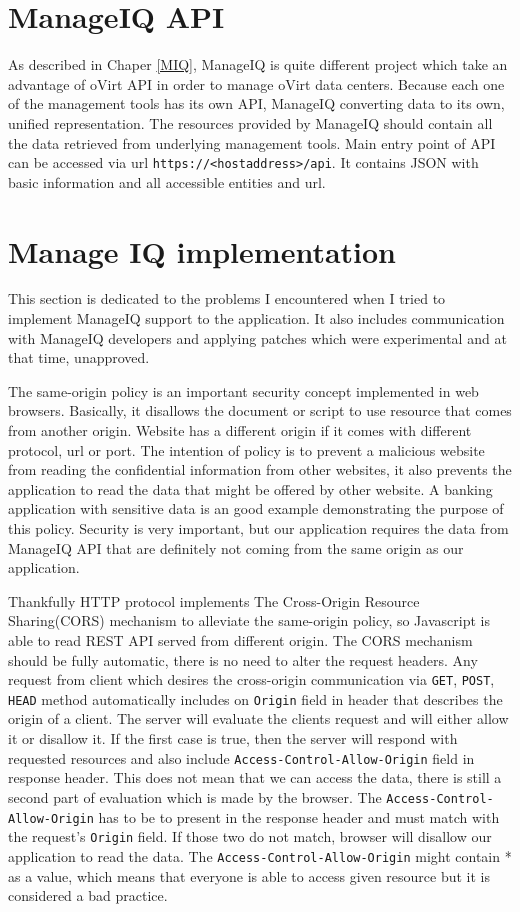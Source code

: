 \section{ManageIQ API}\label{miq}
As described in Chaper \ref{MIQ}, ManageIQ is quite different project which take an advantage of oVirt API in order to manage oVirt data centers. Because each one of the management tools has its own API, ManageIQ converting data to its own, unified representation. The resources provided by ManageIQ should contain all the data retrieved from underlying management tools.
Main entry point of API can be accessed via url \texttt{https://<hostaddress>/api}. It contains JSON with basic information and all accessible entities and url. 

\section{Manage IQ implementation}
This section is dedicated to the problems I encountered when I tried to implement ManageIQ support to the application. It also includes communication with ManageIQ developers and applying patches which were experimental and at that time, unapproved.

The same-origin policy\cite{policy} is an important security concept implemented in web browsers. Basically, it disallows the document or script to use resource that comes from another origin. Website has a different origin if it comes with different protocol, url or port. The intention of policy is to prevent a malicious website from reading the confidential information from other websites, it also prevents the application to read the data that might be offered by other website. A banking application with sensitive data is an good example demonstrating the purpose of this policy. Security is very important, but our application requires the data from ManageIQ API that are definitely not coming from the same origin as our application.

Thankfully HTTP protocol implements The Cross-Origin Resource Sharing(CORS)\cite{cors} mechanism to alleviate the same-origin policy, so Javascript is able to read REST API served from different origin. The CORS mechanism should be fully automatic, there is no need to alter the request headers. Any request from client which desires the cross-origin communication via \texttt{GET}, \texttt{POST}, \texttt{HEAD} method automatically includes on \texttt{Origin} field in header that describes the origin of a client. The server will evaluate the clients request and will either allow it or disallow it. If the first case is true, then the server will respond with requested resources and also include \texttt{Access-Control-Allow-Origin} field in response header. This does not mean that we can access the data, there is still a second part of evaluation which is made by the browser. The \texttt{Access-Control-Allow-Origin} has to be to present in the response header and must match with the request's \texttt{Origin} field. If those two do not match, browser will disallow our application to read the data. The \texttt{Access-Control-Allow-Origin} might contain * as a value, which means that everyone is able to access given resource but it is considered a bad practice.

